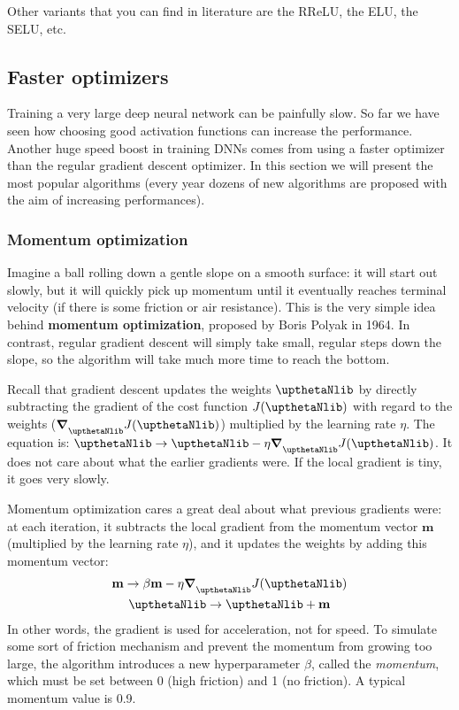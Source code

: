 Other variants that you can find in literature are the RReLU, the ELU, the SELU, etc.
\subsection{Faster optimizers}
Training a very large deep neural network can be painfully slow. So far we have seen how choosing good activation functions can increase the performance. Another huge speed boost in training DNNs comes from using a faster optimizer than the regular gradient descent optimizer. In this section we will present the most popular algorithms (every year dozens of new algorithms are proposed with the aim of increasing performances).
\subsubsection{Momentum optimization}
Imagine a ball rolling down a gentle slope on a smooth surface: it will start out slowly, but it will quickly pick up momentum until it eventually reaches terminal velocity (if there is some friction or air resistance). This is the very simple idea behind \textbf{momentum optimization}, proposed by Boris Polyak in 1964. In contrast, regular gradient descent will simply take small, regular steps down the slope, so the algorithm will take much more time to reach the bottom.

Recall that gradient descent updates the weights $\boldtheta$ by directly subtracting the gradient of the cost function $J(\boldtheta)$ with regard to the weights ($\boldsymbol{\nabla}_{\boldtheta}J(\boldtheta)$) multiplied by the learning rate $\eta$. The equation is: $\boldtheta\rightarrow\boldtheta-\eta\boldsymbol{\nabla}_{\boldtheta}J(\boldtheta)$. It does not care about what the earlier gradients were. If the local gradient is tiny, it goes very slowly.

Momentum optimization cares a great deal about what previous gradients were: at each iteration, it subtracts the local gradient from the momentum vector $\textbf{m}$ (multiplied by the learning rate $\eta$), and it updates the weights by adding this momentum vector:
\begin{gather}
\mathbf{m}\rightarrow\beta\mathbf{m}-\eta\boldsymbol{\nabla}_{\boldtheta}J(\boldtheta)\\
\boldtheta\rightarrow\boldtheta+\mathbf{m}
\end{gather}
In other words, the gradient is used for acceleration, not for speed. To simulate some sort of friction mechanism and prevent the momentum from growing too large, the algorithm introduces a new hyperparameter $\beta$, called the \emph{momentum}, which must be set between 0 (high friction) and 1 (no friction). A typical momentum value is 0.9.

